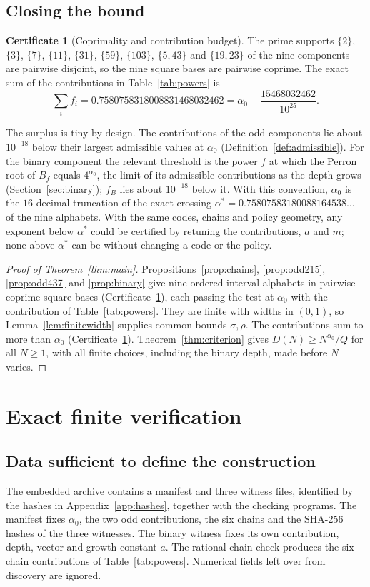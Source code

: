 \documentclass[11pt]{article}
\theoremstyle{definition}
\newtheorem{certificate}[theorem]{Certificate}
\theoremstyle{remark}
\newcommand{\al}{\alpha_0}
\begin{document}
\subsection{Closing the bound}\label{subsec:closing}
\begin{certificate}[Coprimality and contribution budget]\label{cert:budget}
The prime supports $\{2\}$, $\{3\}$, $\{7\}$, $\{11\}$, $\{31\}$,
$\{59\}$, $\{103\}$, $\{5,43\}$ and $\{19,23\}$ of the nine components
are pairwise disjoint, so the nine
square bases are pairwise coprime. The exact sum of the contributions in
Table~\ref{tab:powers} is
\[
 \sum_if_i=0.7580758318008831468032462=\al+\frac{15468032462}{10^{25}}.
\]
\end{certificate}
The surplus is tiny by design. The contributions of the odd components lie
about $10^{-18}$ below their largest admissible values at $\al$
(Definition~\ref{def:admissible}). For the binary component the relevant
threshold is the power $f$ at which the Perron root of $B_f$ equals
$4^{\al}$, the limit of its admissible contributions as the depth grows
(Section~\ref{sec:binary}); $f_B$ lies about $10^{-18}$ below it. With this
convention, $\al$ is the $16$-decimal truncation of the exact crossing
$\alpha^*=0.75807583180088164538\ldots$ of the nine alphabets. With the same codes, chains and policy geometry, any exponent below
$\alpha^*$ could be certified by retuning the contributions, $a$ and $m$;
none above $\alpha^*$ can be without changing a code or the policy.

\begin{proof}[Proof of Theorem~\ref{thm:main}]
Propositions~\ref{prop:chains}, \ref{prop:odd215}, \ref{prop:odd437} and
\ref{prop:binary} give nine ordered interval alphabets in pairwise coprime
square bases (Certificate~\ref{cert:budget}), each passing the test at $\al$
with the contribution of Table~\ref{tab:powers}. They are finite with widths
in $(0,1)$, so Lemma~\ref{lem:finitewidth} supplies common bounds
$\sigma,\rho$. The contributions sum to more than $\al$
(Certificate~\ref{cert:budget}). Theorem~\ref{thm:criterion} gives
$D(N)\ge N^{\al}/Q$ for all $N\ge1$, with all finite choices, including the
binary depth, made before $N$ varies.
\end{proof}

\section{Exact finite verification}\label{sec:verification}
\subsection{Data sufficient to define the construction}
The embedded archive contains a manifest and three witness files, identified
by the hashes in Appendix~\ref{app:hashes}, together with the checking
programs. The manifest fixes $\al$, the two odd contributions, the six chains
and the SHA-256 hashes of the three witnesses. The binary witness fixes its
own contribution, depth, vector and growth constant $a$. The rational chain
check produces the six chain contributions of Table~\ref{tab:powers}.
Numerical fields left over from discovery are ignored.
\end{document}
